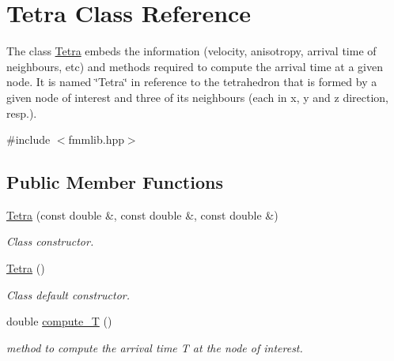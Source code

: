 \hypertarget{class_tetra}{}\section{Tetra Class Reference}
\label{class_tetra}


The class \hyperlink{class_tetra}{Tetra} embeds the information (velocity, anisotropy, arrival time of neighbours, etc) and methods required to compute the arrival time at a given node. It is named \char`\"{}\+Tetra\char`\"{} in reference to the tetrahedron that is formed by a given node of interest and three of its neighbours (each in x, y and z direction, resp.).  




{\ttfamily \#include $<$fmmlib.\+hpp$>$}

\subsection*{Public Member Functions}
\begin{DoxyCompactItemize}
\item 
\hyperlink{class_tetra_a3a693e516febb69a64eb9d6270390c4f}{Tetra} (const double \&, const double \&, const double \&)
\begin{DoxyCompactList}\small\item\em Class constructor. \end{DoxyCompactList}\item 
\hypertarget{class_tetra_ab782abc840e4ecc354eca9bdec150b05}{}\hyperlink{class_tetra_ab782abc840e4ecc354eca9bdec150b05}{Tetra} ()\label{class_tetra_ab782abc840e4ecc354eca9bdec150b05}

\begin{DoxyCompactList}\small\item\em Class default constructor. \end{DoxyCompactList}\item 
double \hyperlink{class_tetra_af07f0f99465e9f0fddc5e0621b5f0b49}{compute\+\_\+\+T} ()
\begin{DoxyCompactList}\small\item\em method to compute the arrival time T at the node of interest. \end{DoxyCompactList}\end{DoxyCompactItemize}
